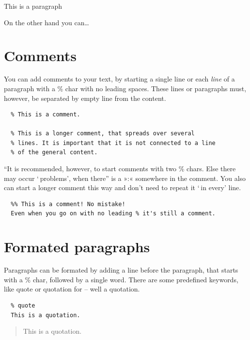 \documentclass{article}
\begin{document}
\colorbox{gray!75}{\parbox{\linewidth}{%
{
This is a paragraph\\}
}
}

{On the other hand you can…\\}

\section{Comments}
\label{}

{You can add comments to your text, by starting a single line
or each \emph{line} of a paragraph with a \% char with no leading
spaces. These lines or paragraphs must, however, be
separated by empty line from the content.\\}

\begin{verbatim}
  % This is a comment.

  % This is a longer comment, that spreads over several
  % lines. It is important that it is not connected to a line
  % of the general content.
\end{verbatim}


{“It is recommended, however, to start comments with two \% chars.
Else there may occur ‘ problems’, when there” is a »:« somewhere
in the comment. You also can start a longer comment this way
and don't need to repeat it ‘ in every’ line.\\}

\begin{verbatim}
  %% This is a comment! No mistake!
  Even when you go on with no leading % it's still a comment.
\end{verbatim}



\section{Formated paragraphs}
\label{}

{Paragraphs can be formated by adding a line before the
paragraph, that starts with a \% char, followed by a single
word. There are some predefined keywords, like quote or
quotation for – well a quotation.\\}

\begin{verbatim}
  % quote
  This is a quotation.
\end{verbatim}


\begin{quote}
This is a quotation.
\end{quote}
\end{document}
